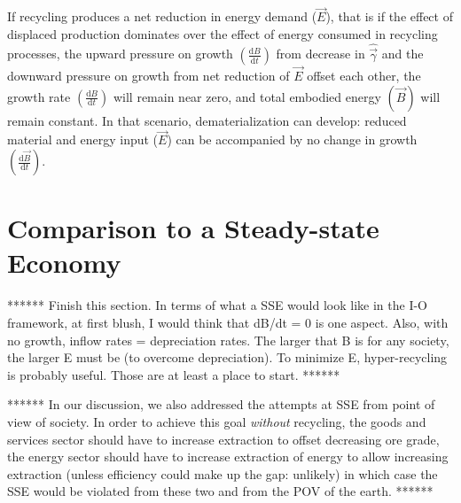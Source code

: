 If recycling produces a net reduction in energy demand ($\vec{E}$), 
that is if the effect of displaced production dominates over the effect 
of energy consumed in recycling processes, 
the upward pressure on growth $\left(\frac{\mathrm{d}B}{\mathrm{d}t}\right)$ 
from decrease in $\hat{\vec{\gamma}}$ and 
the downward pressure on growth from net reduction of $\vec{E}$ 
offset each other, 
the growth rate $\left(\frac{\mathrm{d}B}{\mathrm{d}t}\right)$ 
will remain near zero, 
and total embodied energy $(\vec{B})$ will remain constant. 
In that scenario, dematerialization can develop: 
reduced material and energy input ($\vec{E}$) can be accompanied by 
no change in growth $\left(\frac{\mathrm{d}\vec{B}}{\mathrm{d}t}\right)$.


\section{Comparison to a Steady-state Economy}

****** Finish this section. 
In terms of what a SSE would look like in the I-O framework, 
at first blush, I would think that dB/dt = 0 is one aspect.  
Also, with no growth, inflow rates = depreciation rates.  
The larger that B is for any society, the larger E must be (to overcome depreciation).  
To minimize E, hyper-recycling is probably useful.  
Those are at least a place to start. ******

****** In our discussion, 
we also addressed the attempts at SSE from point of view of society. 
In order to achieve this goal \emph{without} recycling, 
the goods and services sector should have to increase extraction to offset decreasing ore grade, 
the energy sector should have to increase extraction of energy 
to allow increasing extraction (unless efficiency could make up the gap: unlikely) 
in which case the SSE would be violated from these two and from the POV of the earth.
******







